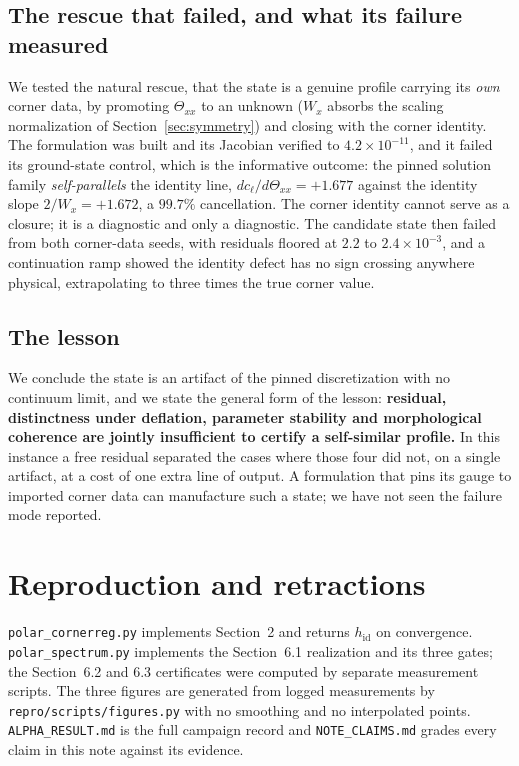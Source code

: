 \documentclass[11pt]{article}
\newcommand{\hid}{h_{\mathrm{id}}}
\begin{document}
\subsection{The rescue that failed, and what its failure measured}
\label{sec:rescue}

We tested the natural rescue, that the state is a genuine profile carrying its \emph{own}
corner data, by promoting $\Theta_{xx}$ to an unknown ($W_x$ absorbs the scaling
normalization of Section~\ref{sec:symmetry}) and closing with the corner identity. The
formulation was built and its Jacobian verified to $4.2\times10^{-11}$, and it failed its
ground-state control, which is the informative outcome: the pinned solution family
\emph{self-parallels} the identity line, $dc_\ell/d\Theta_{xx} = +1.677$ against the
identity slope $2/W_x = +1.672$, a $99.7\%$ cancellation. The corner identity cannot
serve as a closure; it is a diagnostic and only a diagnostic. The candidate state then
failed from both corner-data seeds, with residuals floored at $2.2$ to
$2.4\times10^{-3}$, and a continuation ramp showed the identity defect has no sign
crossing anywhere physical, extrapolating to three times the true corner value.

\subsection{The lesson}

We conclude the state is an artifact of the pinned discretization with no continuum
limit, and we state the general form of the lesson: \textbf{residual, distinctness under
deflation, parameter stability and morphological coherence are jointly insufficient to
certify a self-similar profile.} In this instance a free residual separated the cases
where those four did not, on a single artifact, at a cost of one extra line of output. A
formulation that pins its gauge to imported corner data can manufacture such a state; we
have not seen the failure mode reported.

\section{Reproduction and retractions}

\texttt{polar\_cornerreg.py} implements Section~2 and returns $\hid$ on convergence.
\texttt{polar\_spectrum.py} implements the Section~6.1 realization and its three gates;
the Section~6.2 and 6.3 certificates were computed by separate measurement scripts. The
three figures are generated from logged measurements by \texttt{repro/scripts/figures.py}
with no smoothing and no interpolated points. \texttt{ALPHA\_RESULT.md} is the full
campaign record and \texttt{NOTE\_CLAIMS.md} grades every claim in this note against its
evidence.
\end{document}
